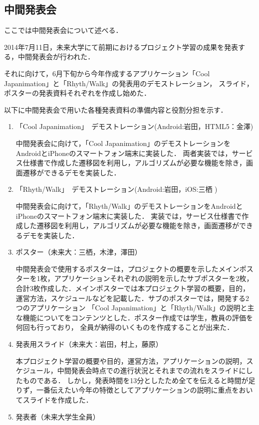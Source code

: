 \subsection{中間発表会}
\par ここでは中間発表会について述べる．
\par
2014年7月11日，未来大学にて前期におけるプロジェクト学習の成果を発表する，中間発表会が行われた．
\par
それに向けて，6月下旬から今年作成するアプリケーション「Cool Japanimation」と「Rhyth/Walk」の発表用のデモストレーション，
スライド，ポスターの発表資料それぞれを作成し始めた．
\par
以下に中間発表会で用いた各種発表資料の準備内容と役割分担を示す．
\begin{enumerate}
\item
「Cool Japanimation」　デモストレーション(Android:岩田，HTML5：金澤)
\par 中間発表会に向けて，「Cool Japanimation」のデモストレーションをAndroidとiPhoneのスマートフォン端末に実装した．
両者実装では，サービス仕様書で作成した遷移図を利用し，アルゴリズムが必要な機能を除き，画面遷移ができるデモを実装した．
\item 「Rhyth/Walk」　デモストレーション(Android:岩田，iOS:三栖 )
\par
中間発表会に向けて，「Rhyth/Walk」のデモストレーションをAndroidとiPhoneのスマートフォン端末に実装した．
実装では，サービス仕様書で作成した遷移図を利用し，アルゴリズムが必要な機能を除き，画面遷移ができるデモを実装した．
\item ポスター（未来大：三栖，木津，澤田）
\par
中間発表会で使用するポスターは，プロジェクトの概要を示したメインポスターを1枚，アプリケーションそれぞれの説明を示したサブポスターを2枚，
合計3枚作成した．メインポスターでは本プロジェクト学習の概要，目的，運営方法，スケジュールなどを記載した．サブのポスターでは，開発する2つのアプリケーション
「Cool Japanimation」と「Rhyth/Walk」の説明と主な機能についてをコンテンツとした．ポスター作成では学生，教員の評価を何回も行っており，
全員が納得のいくものを作成することが出来た．
\item 発表用スライド（未来大：岩田，村上，藤原）
\par
本プロジェクト学習の概要や目的，運営方法，アプリケーションの説明，スケジュール，中間発表会時点での進行状況とそれまでの流れをスライドにしたものである．
しかし，発表時間を13分としたため全てを伝えると時間が足りず，一番伝えたい今年の特徴としてアプリケーションの説明に重点をおいてスライドを作成した．
\item 発表者（未来大学生全員）

\end{enumerate}
